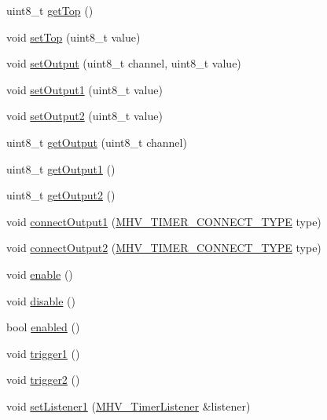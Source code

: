 \begin{DoxyCompactItemize}
\item 
uint8\-\_\-t \hyperlink{class_m_h_v___timer8_a37004c8305a689239cde4a9f6fa51fa5}{get\-Top} ()
\item 
void \hyperlink{class_m_h_v___timer8_a1e2da36ae04182ffe36f3e7504744168}{set\-Top} (uint8\-\_\-t value)
\item 
void \hyperlink{class_m_h_v___timer8_a5b165bd717b85730b2d92314b9d16617}{set\-Output} (uint8\-\_\-t channel, uint8\-\_\-t value)
\item 
void \hyperlink{class_m_h_v___timer8_afcb083692e774d84872b85a82a95c0a6}{set\-Output1} (uint8\-\_\-t value)
\item 
void \hyperlink{class_m_h_v___timer8_ac36f7d0d7827acf902bb850b81f2d76f}{set\-Output2} (uint8\-\_\-t value)
\item 
uint8\-\_\-t \hyperlink{class_m_h_v___timer8_a643aa48eeb3653e233423d372c77af59}{get\-Output} (uint8\-\_\-t channel)
\item 
uint8\-\_\-t \hyperlink{class_m_h_v___timer8_a079f492f84cbb561013afdcfcc23bb14}{get\-Output1} ()
\item 
uint8\-\_\-t \hyperlink{class_m_h_v___timer8_a7d941cc774d1fda7f94b14d191b8d7e1}{get\-Output2} ()
\item 
void \hyperlink{class_m_h_v___timer8_a8babe8403f7cd117145f7a6faf79c755}{connect\-Output1} (\hyperlink{_m_h_v___timer8_8h_a6655b3f5fdc629857c7c337fa819421a}{\-M\-H\-V\-\_\-\-T\-I\-M\-E\-R\-\_\-\-C\-O\-N\-N\-E\-C\-T\-\_\-\-T\-Y\-P\-E} type)
\item 
void \hyperlink{class_m_h_v___timer8_a95e432f5240fd44204dd3fc203a8ef7b}{connect\-Output2} (\hyperlink{_m_h_v___timer8_8h_a6655b3f5fdc629857c7c337fa819421a}{\-M\-H\-V\-\_\-\-T\-I\-M\-E\-R\-\_\-\-C\-O\-N\-N\-E\-C\-T\-\_\-\-T\-Y\-P\-E} type)
\item 
void \hyperlink{class_m_h_v___timer8_a963a2426ca2cd67242039e31760202eb}{enable} ()
\item 
void \hyperlink{class_m_h_v___timer8_acb53366943386bf683ab97a8de42eee8}{disable} ()
\item 
bool \hyperlink{class_m_h_v___timer8_a28aa46400cf8c1f279e9588f1a912b65}{enabled} ()
\item 
void \hyperlink{class_m_h_v___timer8_a29d11c49e658ba8d2936b62f0fa75806}{trigger1} ()
\item 
void \hyperlink{class_m_h_v___timer8_a4c99d0b6b3b546fcb73b59540f7f88c4}{trigger2} ()
\item 
void \hyperlink{class_m_h_v___timer8_aca7400805427d1d8704af3c946533fa3}{set\-Listener1} (\hyperlink{class_m_h_v___timer_listener}{\-M\-H\-V\-\_\-\-Timer\-Listener} \&listener)

\end{DoxyCompactItemize}
